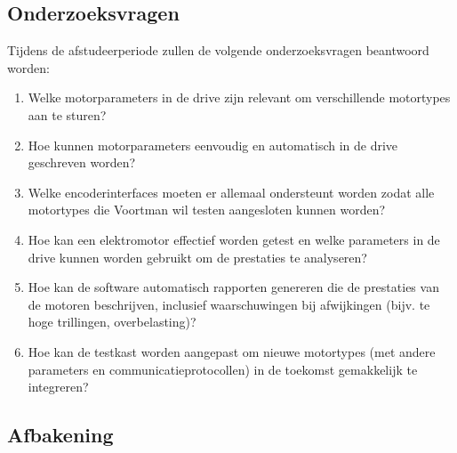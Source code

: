 \subsection{Onderzoeksvragen}

Tijdens de afstudeerperiode zullen de volgende onderzoeksvragen beantwoord worden:

\begin{enumerate}
	\item Welke motorparameters in de drive zijn relevant om verschillende motortypes aan te sturen?
	
	\item Hoe kunnen motorparameters eenvoudig en automatisch in de drive geschreven worden?
	
	\item Welke encoderinterfaces moeten er allemaal ondersteunt worden zodat alle motortypes die Voortman wil testen aangesloten kunnen worden?
	
	\item Hoe kan een elektromotor effectief worden getest en welke parameters in de drive kunnen worden gebruikt om de prestaties te analyseren?
	
	\item Hoe kan de software automatisch rapporten genereren die de prestaties van de motoren beschrijven, inclusief waarschuwingen bij afwijkingen (bijv. te hoge trillingen, overbelasting)?
	
	\item Hoe kan de testkast worden aangepast om nieuwe motortypes (met andere parameters en communicatieprotocollen) in de toekomst gemakkelijk te integreren?
\end{enumerate}

\subsection{Afbakening}

